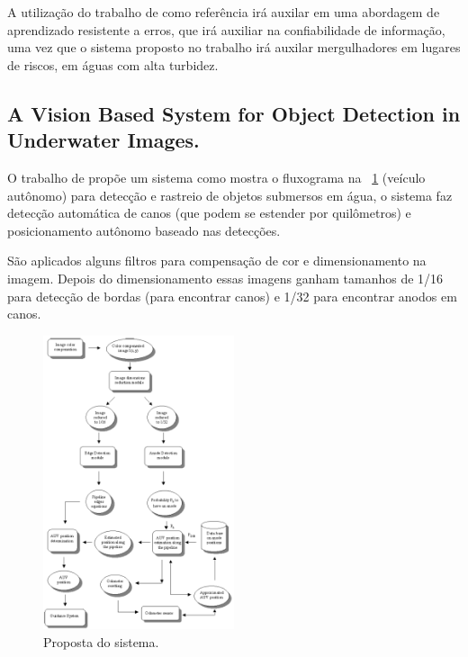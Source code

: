 A utilização do trabalho de  como referência irá auxilar em uma abordagem de aprendizado resistente a erros, que irá auxiliar na confiabilidade de informação, uma vez que o sistema proposto no trabalho irá auxilar mergulhadores em lugares de riscos, em águas com alta turbidez. 


\subsection{A Vision Based System for Object Detection in Underwater Images.}

O trabalho de  propõe um sistema como mostra o fluxograma na ~\ref{fig:forestflow} (veículo autônomo) para detecção e rastreio de objetos submersos em água, o sistema faz detecção automática de canos (que podem se estender por quilômetros) e posicionamento autônomo baseado nas detecções.

São aplicados alguns filtros para compensação de cor e dimensionamento na imagem. Depois do dimensionamento essas imagens ganham tamanhos de 1/16 para detecção de bordas (para encontrar canos) e 1/32 para encontrar anodos em canos.
\begin{figure}[h]
	\caption{\label{fig:forestflow}Proposta do sistema.}
	\begin{center}
	    \includegraphics[width=0.5\textwidth]{resources/flowchartforest}
	\end{center}
\end{figure}

